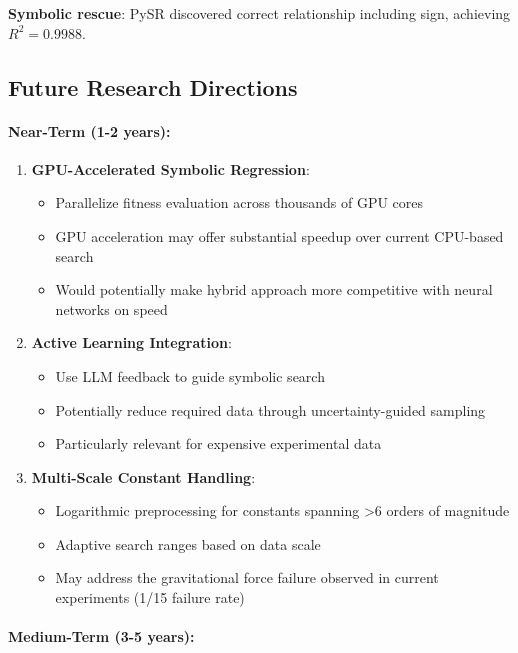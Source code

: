 \documentclass[11pt,a4paper]{article}
\begin{document}
\textbf{Symbolic rescue}: PySR discovered correct relationship including sign, achieving $R^2 = 0.9988$.

\subsection{Future Research Directions}
\label{sec:future_work}

\paragraph{Near-Term (1-2 years):}

\begin{enumerate}
\item \textbf{GPU-Accelerated Symbolic Regression}:
   \begin{itemize}
   \item Parallelize fitness evaluation across thousands of GPU cores
   \item GPU acceleration may offer substantial speedup over current CPU-based search
   \item Would potentially make hybrid approach more competitive with neural networks on speed
   \end{itemize}

\item \textbf{Active Learning Integration}:
   \begin{itemize}
   \item Use LLM feedback to guide symbolic search
   \item Potentially reduce required data through uncertainty-guided sampling
   \item Particularly relevant for expensive experimental data
   \end{itemize}

\item \textbf{Multi-Scale Constant Handling}:
   \begin{itemize}
   \item Logarithmic preprocessing for constants spanning >6 orders of magnitude
   \item Adaptive search ranges based on data scale
   \item May address the gravitational force failure observed in current experiments (1/15 failure rate)
   \end{itemize}
\end{enumerate}

\paragraph{Medium-Term (3-5 years):}
\end{document}
